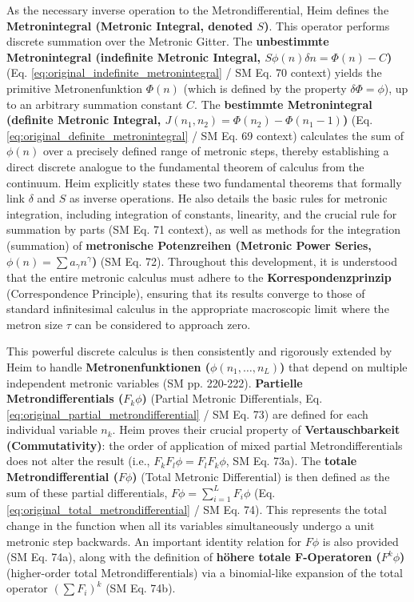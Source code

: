 \documentclass[12pt]{article}
\newcommand{\metron}{\tau}
\newcommand{\metrondifferential}{\delta}
\newcommand{\metronintegral}{S}
\newcommand{\metronenziffer}{n}
\begin{document}
As the necessary inverse operation to the Metrondifferential, Heim defines the \textbf{Metronintegral (Metronic Integral, denoted \( \metronintegral \))}. This operator performs discrete summation over the Metronic Gitter. The \textbf{unbestimmte Metronintegral (indefinite Metronic Integral, \( \metronintegral\phi(\metronenziffer)\metrondifferential\metronenziffer = \Phi(\metronenziffer) - C \))} (Eq. \eqref{eq:original_indefinite_metronintegral} / SM Eq. 70 context) yields the primitive Metronenfunktion \( \Phi(\metronenziffer) \) (which is defined by the property \( \metrondifferential\Phi = \phi \)), up to an arbitrary summation constant \(C\). The \textbf{bestimmte Metronintegral (definite Metronic Integral, \( J(n_1, n_2) = \Phi(n_2) - \Phi(n_1-1) \))} (Eq. \eqref{eq:original_definite_metronintegral} / SM Eq. 69 context) calculates the sum of \( \phi(\metronenziffer) \) over a precisely defined range of metronic steps, thereby establishing a direct discrete analogue to the fundamental theorem of calculus from the continuum. Heim explicitly states these two fundamental theorems that formally link \( \metrondifferential \) and \( \metronintegral \) as inverse operations. He also details the basic rules for metronic integration, including integration of constants, linearity, and the crucial rule for summation by parts (SM Eq. 71 context), as well as methods for the integration (summation) of \textbf{metronische Potenzreihen (Metronic Power Series, \( \phi(\metronenziffer) = \sum a_\gamma \metronenziffer^\gamma \))} (SM Eq. 72). Throughout this development, it is understood that the entire metronic calculus must adhere to the \textbf{Korrespondenzprinzip} (Correspondence Principle), ensuring that its results converge to those of standard infinitesimal calculus in the appropriate macroscopic limit where the metron size \( \metron \) can be considered to approach zero.

This powerful discrete calculus is then consistently and rigorously extended by Heim to handle \textbf{Metronenfunktionen (\( \phi(n_1, \dots, n_L) \))} that depend on multiple independent metronic variables (SM pp. 220-222). \textbf{Partielle Metrondifferentials (\( F_k\phi \))} (Partial Metronic Differentials, Eq. \eqref{eq:original_partial_metrondifferential} / SM Eq. 73) are defined for each individual variable \(n_k\). Heim proves their crucial property of \textbf{Vertauschbarkeit (Commutativity)}: the order of application of mixed partial Metrondifferentials does not alter the result (i.e., \( F_kF_l\phi = F_lF_k\phi \), SM Eq. 73a). The \textbf{totale Metrondifferential (\( F\phi \))} (Total Metronic Differential) is then defined as the sum of these partial differentials, \( F\phi = \sum_{i=1}^L F_i\phi \) (Eq. \eqref{eq:original_total_metrondifferential} / SM Eq. 74). This represents the total change in the function when all its variables simultaneously undergo a unit metronic step backwards. An important identity relation for \( F\phi \) is also provided (SM Eq. 74a), along with the definition of \textbf{höhere totale F-Operatoren (\( F^k\phi \))} (higher-order total Metrondifferentials) via a binomial-like expansion of the total operator \( (\sum F_i)^k \) (SM Eq. 74b).
\end{document}
